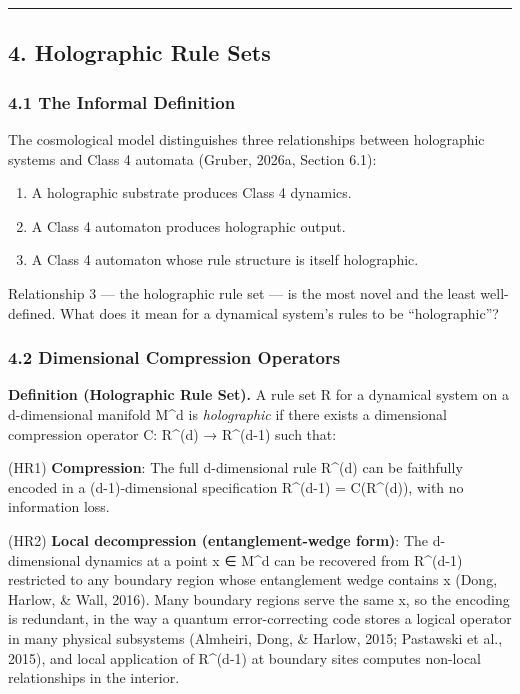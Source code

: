 \documentclass[
]{article}
\providecommand{\tightlist}{%
  \setlength{\itemsep}{0pt}\setlength{\parskip}{0pt}}
\begin{document}
\begin{center}\rule{0.5\linewidth}{0.5pt}\end{center}

\hypertarget{holographic-rule-sets}{%
\subsection{4. Holographic Rule Sets}\label{holographic-rule-sets}}

\hypertarget{the-informal-definition}{%
\subsubsection{4.1 The Informal
Definition}\label{the-informal-definition}}

The cosmological model distinguishes three relationships between
holographic systems and Class 4 automata (Gruber, 2026a, Section 6.1):

\begin{enumerate}
\def\labelenumi{\arabic{enumi}.}
\tightlist
\item
  A holographic substrate produces Class 4 dynamics.
\item
  A Class 4 automaton produces holographic output.
\item
  A Class 4 automaton whose rule structure is itself holographic.
\end{enumerate}

Relationship 3 --- the holographic rule set --- is the most novel and
the least well-defined. What does it mean for a dynamical system's rules
to be ``holographic''?

\hypertarget{dimensional-compression-operators}{%
\subsubsection{4.2 Dimensional Compression
Operators}\label{dimensional-compression-operators}}

\textbf{Definition (Holographic Rule Set).} A rule set R for a dynamical
system on a d-dimensional manifold M\^{}d is \emph{holographic} if there
exists a dimensional compression operator C: R\^{}(d) → R\^{}(d-1) such
that:

(HR1) \textbf{Compression}: The full d-dimensional rule R\^{}(d) can be
faithfully encoded in a (d-1)-dimensional specification R\^{}(d-1) =
C(R\^{}(d)), with no information loss.

(HR2) \textbf{Local decompression (entanglement-wedge form)}: The
d-dimensional dynamics at a point x ∈ M\^{}d can be recovered from
R\^{}(d-1) restricted to any boundary region whose entanglement wedge
contains x (Dong, Harlow, \& Wall, 2016). Many boundary regions serve
the same x, so the encoding is redundant, in the way a quantum
error-correcting code stores a logical operator in many physical
subsystems (Almheiri, Dong, \& Harlow, 2015; Pastawski et al., 2015),
and local application of R\^{}(d-1) at boundary sites computes non-local
relationships in the interior.
\end{document}
